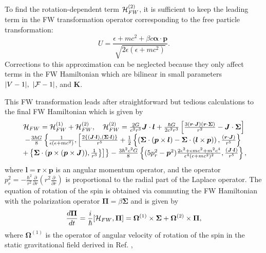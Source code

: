\documentclass[preprint,showpacs,preprintnumbers,amsmath,amssymb]{revtex4}
\begin{document}
To find the rotation-dependent term ${\cal H}_{FW}^{(2)}$, it is
sufficient to keep the leading term in the FW transformation
operator \cite{PRD} corresponding to the free particle
transformation:
\begin{equation}
U=\frac{\epsilon+mc^2+\beta c\bm{\alpha}
\cdot\bm{p}}{\sqrt{2\epsilon(\epsilon+mc^2)}}. \label{fpFWt}
\end{equation}
Corrections to this approximation can be neglected because they
only affect terms in the FW Hamiltonian which are bilinear in
small parameters $|V-1|,~|{\cal F}-1|$, and $\bm K$.

This FW transformation leads after straightforward but tedious
calculations to the final FW Hamiltonian which is given by
\begin{equation}
\begin{array}{c}
{\cal H}_{FW}={\cal H}_{FW}^{(1)}+{\cal H}_{FW}^{(2)},\quad
{\cal H}_{FW}^{(2)}=\frac{2G}{c^2r^3}\bm J\cdot\bm l + {\frac
{\hbar G}{2c^2r^3}}\left[\frac{3(\bm r\cdot\bm J)(\bm r\cdot
\bm \Sigma)}{r^2}- \bm J\cdot\bm \Sigma\right]\\
-\frac{3\hbar G}{8}\left \{\frac{1}{\epsilon(\epsilon+mc^2)},
\left[\frac{2\{(\bm J\cdot\bm l), (\bm \Sigma\cdot\bm l)\}}{r^5}
+\frac{1}{2}\left\{\left(\bm \Sigma\cdot (\bm p\times\bm l)
-\bm\Sigma\cdot(\bm l\times\bm p)\right),\frac {(\bm r\cdot\bm J)}
{r^5}\right\}\right.\right.\\
\left.\left. +\left\{\bm \Sigma\cdot(\bm p\times(\bm p\times\bm
J)), \frac{1}{r^3}\right\}\right]\right\}-\frac{3\hbar^2c^2
G}{8}\left\{ (5p_r^2-\bm p^2)\frac{2\epsilon^2+\epsilon
mc^2+m^2c^4}{\epsilon^4 (\epsilon+mc^2)^2},\frac{(\bm J\cdot\bm
l)}{r^5}\right\},
\end{array} \label{finalH}
\end{equation}
where $\bm l=\bm r\times\bm p$ is an angular momentum operator,
and the operator $p_r^2=-\frac{\hbar^2}{r^2}\frac{\partial}{\partial
r}\left(r^2\frac{\partial}{\partial r}\right)$ is proportional to
the radial part of the Laplace operator. The equation of rotation
of the spin is obtained via commuting the FW Hamiltonian with the
polarization operator $\bm\Pi=\beta\bm\Sigma$ and is given by
\begin{equation}
\frac{d\bm \Pi}{dt}=\frac{i}{\hbar}[{\cal H}_{FW},\bm
\Pi]=\bm\Omega^{(1)}\times\bm \Sigma+\bm\Omega^{(2)}\times\bm \Pi,
\label{spinmeq}\end{equation} where $\bm\Omega^{(1)}$ is the
operator of angular velocity of rotation of the spin in the static
gravitational field derived in Ref. \cite{PRD},
\end{document}
